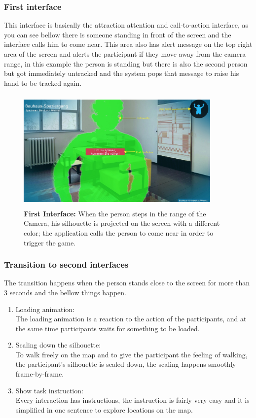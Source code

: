 \subsubsection{First interface}
This interface is basically the attraction attention and call-to-action interface, as you can see bellow there is someone standing in front of the screen and the interface calls him to come near. This area also has alert message on the top right area of the screen and alerts the participant if they move away from the camera range, in this example the person is standing but there is also the second person but got immediately untracked and the system pops that message to raise his hand to be tracked again.
\begin{figure}[H]
    \centering
    \includegraphics[width=100mm,height=60mm]{Figures/7/body_interactive/first_interface}
    \caption{\textbf{First Interface:} When the person steps in the range of the Camera, his silhouette is projected on the screen with a different color; the application calls the person to come near in order to trigger the game.}%
    \label{fig:body_firstinterface}%
\end{figure}



\subsubsection{Transition to second interfaces}
The transition happens when the person stands close to the screen for more than 3 seconds and the bellow things happen.

\begin{enumerate}
\item Loading animation:\\
  The loading animation is a reaction to the action of the participants, and at the same time participants waits for something to be loaded.
\item Scaling down the silhouette: \\
To walk freely on the map and to give the participant the feeling of walking, the participant's silhouette is scaled down, the scaling happens smoothly frame-by-frame.
\item Show task instruction:  \\
Every interaction has instructions, the instruction is fairly very easy and it is simplified in one sentence to explore locations on the map.
\end{enumerate}



